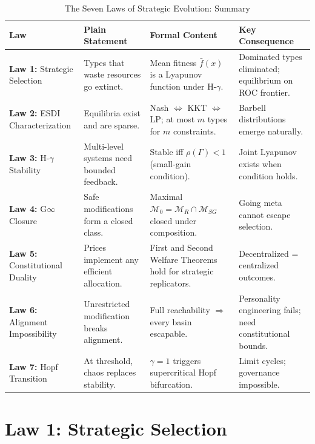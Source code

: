 \documentclass[12pt]{article}
\begin{document}
\begin{table}[h]
\centering
\caption{The Seven Laws of Strategic Evolution: Summary}
\label{tab:seven-laws-summary}
\begin{tabular}{@{}p{2.8cm}p{4.2cm}p{4.2cm}p{3cm}@{}}
\toprule
\textbf{Law} & \textbf{Plain Statement} & \textbf{Formal Content} & \textbf{Key Consequence} \\
\midrule
\textbf{Law 1:} Strategic Selection & Types that waste resources go extinct. & Mean fitness $\bar{f}(x)$ is a Lyapunov function under H-$\gamma$. & Dominated types eliminated; equilibrium on ROC frontier. \\
\addlinespace
\textbf{Law 2:} ESDI Characterization & Equilibria exist and are sparse. & Nash $\Leftrightarrow$ KKT $\Leftrightarrow$ LP; at most $m$ types for $m$ constraints. & Barbell distributions emerge naturally. \\
\addlinespace
\textbf{Law 3:} H-$\gamma$ Stability & Multi-level systems need bounded feedback. & Stable iff $\rho(\Gamma) < 1$ (small-gain condition). & Joint Lyapunov exists when condition holds. \\
\addlinespace
\textbf{Law 4:} G$\infty$ Closure & Safe modifications form a closed class. & Maximal $\mathcal{M}_0 = \mathcal{M}_R \cap \mathcal{M}_{SG}$ closed under composition. & Going meta cannot escape selection. \\
\addlinespace
\textbf{Law 5:} Constitutional Duality & Prices implement any efficient allocation. & First and Second Welfare Theorems hold for strategic replicators. & Decentralized = centralized outcomes. \\
\addlinespace
\textbf{Law 6:} Alignment Impossibility & Unrestricted modification breaks alignment. & Full reachability $\Rightarrow$ every basin escapable. & Personality engineering fails; need constitutional bounds. \\
\addlinespace
\textbf{Law 7:} Hopf Transition & At threshold, chaos replaces stability. & $\gamma = 1$ triggers supercritical Hopf bifurcation. & Limit cycles; governance impossible. \\
\bottomrule
\end{tabular}
\end{table}


\section{Law 1: Strategic Selection}
\label{sec:law1}
\end{document}
